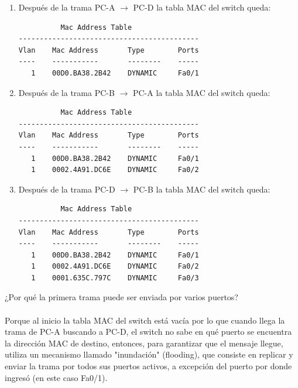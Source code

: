 \begin{enumerate}[label=\arabic*., leftmargin=*]
    \item Después de la trama PC-A $\to$ PC-D la tabla MAC del switch queda:
\begin{verbatim}
          Mac Address Table
-------------------------------------------
Vlan    Mac Address       Type        Ports
----    -----------       --------    -----
   1    00D0.BA38.2B42    DYNAMIC     Fa0/1

\end{verbatim}
    \item Después de la trama PC-B $\to$ PC-A la tabla MAC del switch queda:
\begin{verbatim}
          Mac Address Table
-------------------------------------------
Vlan    Mac Address       Type        Ports
----    -----------       --------    -----
   1    00D0.BA38.2B42    DYNAMIC     Fa0/1
   1    0002.4A91.DC6E    DYNAMIC     Fa0/2

\end{verbatim}
    \item Después de la trama PC-D $\to$ PC-B la tabla MAC del switch queda:
\begin{verbatim}
          Mac Address Table
-------------------------------------------
Vlan    Mac Address       Type        Ports
----    -----------       --------    -----
   1    00D0.BA38.2B42    DYNAMIC     Fa0/1
   1    0002.4A91.DC6E    DYNAMIC     Fa0/2
   1    0001.635C.797C    DYNAMIC     Fa0/3

\end{verbatim}
\end{enumerate}

¿Por qué la primera trama puede ser enviada por varios puertos?\\\\
Porque al inicio la tabla MAC del switch está vacía por lo que cuando llega la trama de PC-A buscando a PC-D, 
el switch no sabe en qué puerto se encuentra la dirección MAC de destino, entonces, para garantizar que el mensaje llegue, 
utiliza un mecanismo llamado "inundación" (flooding), que consiste en replicar y enviar la trama por todos sus puertos 
activos, a excepción del puerto por donde ingresó (en este caso Fa0/1).